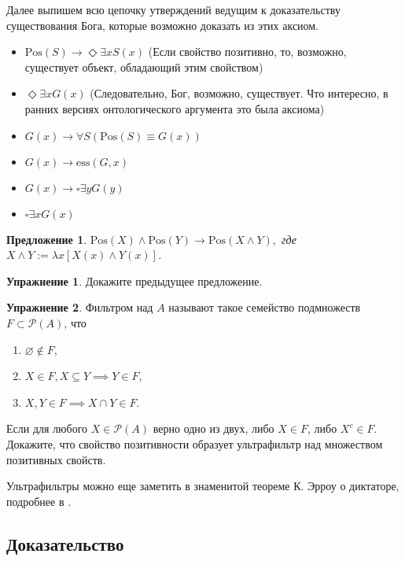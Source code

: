 \documentclass[openany]{book}
\theoremstyle{plain}
\newtheorem{prop}[thm]{Предложение}
\theoremstyle{definition}
\newtheorem{xrc}{Упражнение}[]
\begin{document}
Далее выпишем всю цепочку утверждений ведущим к доказательству существования Бога, которые возможно доказать из этих аксиом.

\begin{itemize}
    \item \(\mathrm{Pos}(S) \to \Diamond \exists x S(x)\) (Если свойство позитивно, то, возможно, существует объект, обладающий этим свойством)
    \item \(\Diamond \exists x G(x)\) (Следовательно, Бог, возможно, существует. Что интересно, в ранних версиях онтологического аргумента это была аксиома)
    \item \(G(x) \to \forall S (\mathrm{Pos}(S) \equiv G(x))\)
    \item \(G(x) \to \mathrm{ess}(G, x)\)
    \item \(G(x) \to \square \exists y G(y)\) 
    \item \(\square \exists x G(x)\)
\end{itemize}

\begin{prop}
    \(\mathrm{Pos}(X) \land \mathrm{Pos}(Y) \to \mathrm{Pos}(X \land Y),\) где \(X \land Y := \lambda x [X(x) \land Y(x)]\).
\end{prop}

\begin{xrc}
    Докажите предыдущее предложение.
\end{xrc}

\begin{xrc}
    Фильтром над \(A\) называют такое семейство подмножеств \(F \subset \mathcal{P}(A)\), что
    \begin{enumerate}
	\item \(\varnothing \not\in F\),
	\item \(X \in F, X \subseteq Y \implies Y \in F\),
	\item \(X, Y \in F \implies X \cap Y \in F\).
    \end{enumerate}
    Если для любого \(X \in \mathcal{P}(A)\) верно одно из двух, либо \(X \in F\), либо \(X^c \in F\).
    Докажите, что свойство позитивности образует ультрафильтр над множеством позитивных свойств.
\end{xrc}

Ультрафильтры можно еще заметить в знаменитой теореме К. Эрроу о диктаторе, подробнее в \cite{Odifreddi}.

\subsection{Доказательство}
\end{document}
